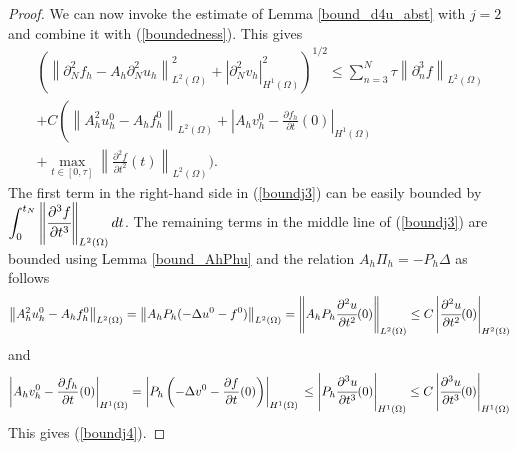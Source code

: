 \documentclass{imanum}
\begin{document}
\begin{proof}
We can now invoke the estimate of Lemma \ref{bound_d4u_abst} with $j=2$ and combine it with (\ref{boundedness}). This gives 
\begin{multline}\label{boundj3}
  \left(\left\| \partial^{2}_Nf_h-A_h\partial^{2}_N u_h \right\|_{L^2(\Omega)}^2 + \left| {\partial}^2_{N} v_h \right|_{H^1(\Omega)}^2\right)^{{1}/{2}}\leq  \sum_{n = 3}^N \tau \left\| {\partial}^3_n f\right\|_{L^2(\Omega)}\\
  + C \left( \left\|A_h^2 u^0_h - A_h f^0_h \right\|_{L^2(\Omega)} + \left|A_h v^0_h - \frac{\partial f_h}{\partial t}(0) \right|_{H^1(\Omega)}\right.\\ + \max_{t\in[0,\tau]}\left\|\frac{\partial^2 f}{\partial t^2}(t)\right\|_{L^2(\Omega)}
\Bigg).
\end{multline}
The first term in the right-hand side in (\ref{boundj3}) can be easily bounded by $\displaystyle\int_0^{t_N} \left\| \cfrac{\partial^{3}f}{\partial t^{3}} \right\|_{L^2(\Omega)}dt$. The remaining terms in the middle line of (\ref{boundj3}) are bounded using Lemma \ref{bound_AhPhu} and the relation $A_h\Pi_h=-P_h\Delta$ as follows
$$ 
\left\|A_h^2 u^0_h - A_h f^0_h \right\|_{L^2 (\Omega)} = \left\|A_h P_h (- \Delta u^0 -
   f^0) \right\|_{L^2(\Omega) }
    = \left\|A_h P_h \cfrac{\partial^{2}u}{\partial t^{2}} (0)\right \|_{L^2(\Omega)
   }
   \leq C \left|  \cfrac{\partial^{2}u}{\partial t^{2}} (0) \right|_{H^2(\Omega) } 
$$
and
$$
\left|A_h v^0_h -\frac{\partial f_h}{\partial t}(0) \right|_{H^1(\Omega)
   } = \left|P_h  \left(- \Delta v^0 - \frac{\partial f}{\partial t}(0)\right)
   \right|_{H^1 (\Omega)} \\
   \leq \left|P_h \cfrac{\partial^{3}u}{\partial t^{3}} (0) \right|_{H^1(\Omega) }
   \leq C
   \left| \cfrac{\partial^{3}u}{\partial t^{3}} (0) \right|_{H^1(\Omega)} 
$$
This gives (\ref{boundj4}). 
\end{proof}
\end{document}
